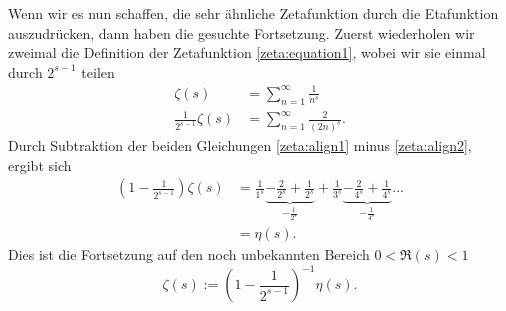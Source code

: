 Wenn wir es nun schaffen, die sehr ähnliche Zetafunktion durch die Etafunktion auszudrücken, dann haben die gesuchte Fortsetzung.
Zuerst wiederholen wir zweimal die Definition der Zetafunktion \eqref{zeta:equation1}, wobei wir sie einmal durch $2^{s-1}$ teilen
\begin{align}
    \zeta(s)
    &=
    \sum_{n=1}^{\infty}
    \frac{1}{n^s} \label{zeta:align1}
    \\
    \frac{1}{2^{s-1}}
    \zeta(s)
    &=
    \sum_{n=1}^{\infty}
    \frac{2}{(2n)^s}. \label{zeta:align2}
\end{align}
Durch Subtraktion der beiden Gleichungen \eqref{zeta:align1} minus \eqref{zeta:align2}, ergibt sich
\begin{align}
    \left(1 - \frac{1}{2^{s-1}} \right)
    \zeta(s)
    &=
    \frac{1}{1^s}
    \underbrace{-\frac{2}{2^s} + \frac{1}{2^s}}_{-\frac{1}{2^s}}
    + \frac{1}{3^s}
    \underbrace{-\frac{2}{4^s} + \frac{1}{4^s}}_{-\frac{1}{4^s}}
    \ldots
    \\
    &= \eta(s).
\end{align}
Dies ist die Fortsetzung auf den noch unbekannten Bereich $0 < \Re(s) < 1$
\begin{equation} \label{zeta:equation:fortsetzung1}
    \zeta(s)
    :=
    \left(1 - \frac{1}{2^{s-1}} \right)^{-1} \eta(s).
\end{equation}

